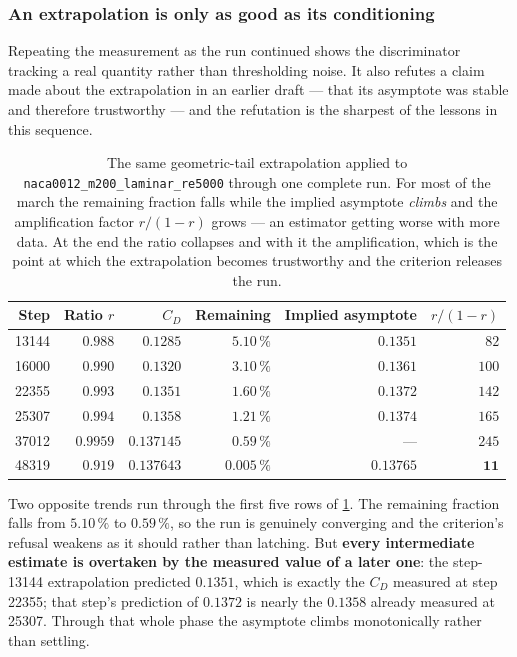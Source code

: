 \subsubsection{An extrapolation is only as good as its conditioning}
\label{sec:conditioning}

Repeating the measurement as the run continued shows the discriminator tracking a real
quantity rather than thresholding noise. It also refutes a claim made about the
extrapolation in an earlier draft --- that its asymptote was stable and therefore
trustworthy --- and the refutation is the sharpest of the lessons in this sequence.

\begin{table}[htbp]
  \centering
  \caption{The same geometric-tail extrapolation applied to
  \texttt{naca0012\_m200\_laminar\_re5000} through one complete run. For most of the march
  the remaining fraction falls while the implied asymptote \emph{climbs} and the
  amplification factor $r/(1-r)$ grows --- an estimator getting worse with more data. At
  the end the ratio collapses and with it the amplification, which is the point at which
  the extrapolation becomes trustworthy and the criterion releases the run.}
  \label{tab:conditioning}
  \small
  \begin{tabular}{rrrrrr}
    \toprule
    Step & Ratio $r$ & $C_D$ & Remaining & Implied asymptote & $r/(1-r)$ \\
    \midrule
    \num{13144} & $0.988$ & $0.1285$ & $5.10\,\%$ & $0.1351$ & $82$ \\
    \num{16000} & $0.990$ & $0.1320$ & $3.10\,\%$ & $0.1361$ & $100$ \\
    \num{22355} & $0.993$ & $0.1351$ & $1.60\,\%$ & $0.1372$ & $142$ \\
    \num{25307} & $0.994$ & $0.1358$ & $1.21\,\%$ & $0.1374$ & $165$ \\
    \num{37012} & $0.9959$ & $0.137145$ & $0.59\,\%$ & --- & $245$ \\
    \midrule
    \num{48319} & $\mathbf{0.919}$ & $0.137643$ & $\mathbf{0.005\,\%}$ & $0.13765$
      & $\mathbf{11}$ \\
    \bottomrule
  \end{tabular}
\end{table}

Two opposite trends run through the first five rows of \cref{tab:conditioning}. The
remaining fraction falls from $5.10\,\%$ to $0.59\,\%$, so the run is genuinely converging
and the criterion's refusal weakens as it should rather than latching. But
\textbf{every intermediate estimate is overtaken by the measured value of a later one}:
the step-\num{13144} extrapolation predicted $0.1351$, which is exactly the $C_D$ measured
at step \num{22355}; that step's prediction of $0.1372$ is nearly the $0.1358$ already
measured at \num{25307}. Through that whole phase the asymptote climbs monotonically
rather than settling.

